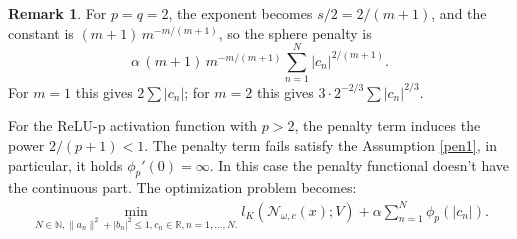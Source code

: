 \documentclass[12pt,fleqn]{amsart}
\theoremstyle{definition}
\newtheorem{remark}{Remark}
\begin{document}
\begin{remark}\leavevmode
	For $p = q = 2$, the exponent becomes $s/2 = 2/(m+1)$, and the constant is $(m+1)\,m^{-m/(m+1)}$, so the sphere penalty is
	\[
	\alpha\,(m+1)\,m^{-m/(m+1)} \sum_{n=1}^N |c_n|^{2/(m+1)}.
	\]
	For $m = 1$ this gives $2\sum|c_n|$; for $m = 2$ this gives $3 \cdot 2^{-2/3}\sum|c_n|^{2/3}$.
\end{remark}

For the ReLU-p activation function with $p > 2$, the penalty term induces the power $2/(p + 1) < 1$. 
The penalty term fails satisfy the Assumption \ref{pen1}, in particular, it holds $\phi_p'(0) = \infty$. 
In this case the penalty functional doesn't have the continuous part. 
The optimization problem becomes:
\begin{equation}
\label{opt_dis_p}
\begin{aligned}
		\min_{N \in \mathbb{N}, \|a_n\|^2 + |b_n|^2 \le  1 , c_n\in \mathbb{R} , n = 1, \dots, N.} l_K(\mathcal{N}_{\omega, c}(x) ;V) + \alpha \sum_{n = 1}^N \phi_p(|c_n|).
\end{aligned}
\end{equation}
\end{document}
